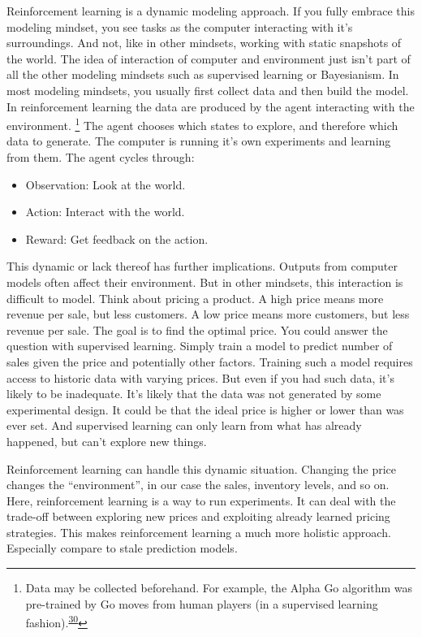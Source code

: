 \documentclass[
  10pt,
]{scrbook}
\providecommand{\tightlist}{%
  \setlength{\itemsep}{0pt}\setlength{\parskip}{0pt}}
\begin{document}
Reinforcement learning is a dynamic modeling approach.
If you fully embrace this modeling mindset, you see tasks as the computer interacting with it's surroundings.
And not, like in other mindsets, working with static snapshots of the world.
The idea of interaction of computer and environment just isn't part of all the other modeling mindsets such as supervised learning or Bayesianism.
In most modeling mindsets, you usually first collect data and then build the model.
In reinforcement learning the data are produced by the agent interacting with the environment. \footnote{Data may be collected beforehand. For example, the Alpha Go algorithm was pre-trained by Go moves from human players (in a supervised learning fashion).\textsuperscript{\protect\hyperlink{ref-chen2018recurrent}{30}}}
The agent chooses which states to explore, and therefore which data to generate.
The computer is running it's own experiments and learning from them.
The agent cycles through:

\begin{itemize}
\tightlist
\item
  Observation: Look at the world.
\item
  Action: Interact with the world.
\item
  Reward: Get feedback on the action.
\end{itemize}

This dynamic or lack thereof has further implications.
Outputs from computer models often affect their environment.
But in other mindsets, this interaction is difficult to model.
Think about pricing a product.
A high price means more revenue per sale, but less customers.
A low price means more customers, but less revenue per sale.
The goal is to find the optimal price.
You could answer the question with supervised learning.
Simply train a model to predict number of sales given the price and potentially other factors.
Training such a model requires access to historic data with varying prices.
But even if you had such data, it's likely to be inadequate.
It's likely that the data was not generated by some experimental design.
It could be that the ideal price is higher or lower than was ever set.
And supervised learning can only learn from what has already happened, but can't explore new things.

Reinforcement learning can handle this dynamic situation.
Changing the price changes the ``environment'', in our case the sales, inventory levels, and so on.
Here, reinforcement learning is a way to run experiments.
It can deal with the trade-off between exploring new prices and exploiting already learned pricing strategies.
This makes reinforcement learning a much more holistic approach.
Especially compare to stale prediction models.
\end{document}
